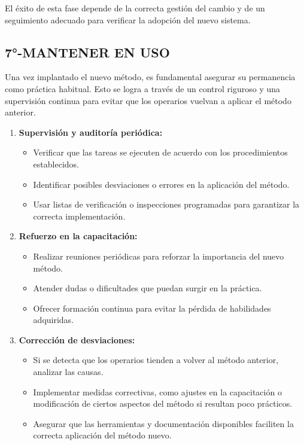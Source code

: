 \documentclass[a4paper,oneside,11pt]{article}
\begin{document}
El éxito de esta fase depende de la correcta gestión del cambio y de un seguimiento adecuado para verificar la adopción del nuevo sistema.

\subsection{7°-MANTENER EN USO}

Una vez implantado el nuevo método, es fundamental asegurar su permanencia como práctica habitual. Esto se logra a través de un control riguroso y una supervisión continua para evitar que los operarios vuelvan a aplicar el método anterior.

\begin{enumerate}
    \item \textbf{Supervisión y auditoría periódica:}
    \begin{itemize}
        \item Verificar que las tareas se ejecuten de acuerdo con los procedimientos establecidos.
        \item Identificar posibles desviaciones o errores en la aplicación del método.
        \item Usar listas de verificación o inspecciones programadas para garantizar la correcta implementación.
    \end{itemize}
    
    \item \textbf{Refuerzo en la capacitación:}
    \begin{itemize}
        \item Realizar reuniones periódicas para reforzar la importancia del nuevo método.
        \item Atender dudas o dificultades que puedan surgir en la práctica.
        \item Ofrecer formación continua para evitar la pérdida de habilidades adquiridas.
    \end{itemize}
    
    \item \textbf{Corrección de desviaciones:}
    \begin{itemize}
        \item Si se detecta que los operarios tienden a volver al método anterior, analizar las causas.
        \item Implementar medidas correctivas, como ajustes en la capacitación o modificación de ciertos aspectos del método si resultan poco prácticos.
        \item Asegurar que las herramientas y documentación disponibles faciliten la correcta aplicación del método nuevo.
    \end{itemize}
    

\end{enumerate}
\end{document}
